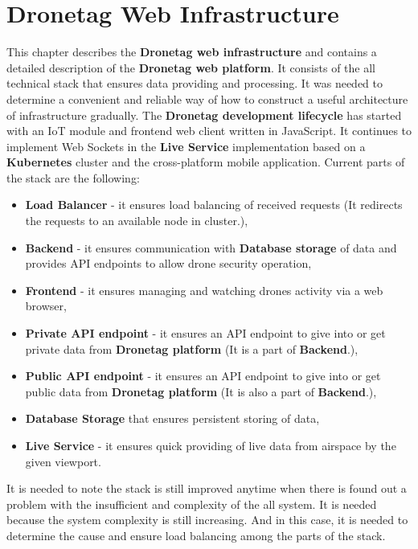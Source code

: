 \chapter{Dronetag Web Infrastructure}\label{ch:dronetag-web-infrastructure}
This chapter describes the \textbf{Dronetag web infrastructure} and contains a detailed description of the \textbf{Dronetag web platform}.
It consists of the all technical stack that ensures data providing and processing.
It was needed to determine a convenient and reliable way of how to construct a useful architecture of infrastructure gradually.
The \textbf{Dronetag development lifecycle} has started with an IoT module and frontend web client written in JavaScript.
It continues to implement Web Sockets in the \textbf{Live Service} implementation based on a \textbf{Kubernetes} cluster and the cross-platform mobile application.
Current parts of the stack are the following:
\begin{itemize}
    \item \textbf{Load Balancer} - it ensures load balancing of received requests (It redirects the requests to an available node in cluster.),
    \item \textbf{Backend} - it ensures communication with \textbf{Database storage} of data and provides API endpoints to allow drone security operation,
    \item \textbf{Frontend} - it ensures managing and watching drones activity via a web browser,
    \item \textbf{Private API endpoint} - it ensures an API endpoint to give into or get private data from \textbf{Dronetag platform} (It is a part of \textbf{Backend}.),
    \item \textbf{Public API endpoint} - it ensures an API endpoint to give into or get public data from \textbf{Dronetag platform} (It is also a part of \textbf{Backend}.),
    \item \textbf{Database Storage} that ensures persistent storing of data,
    \item \textbf{Live Service} - it ensures quick providing of live data from airspace by the given viewport.
\end{itemize}
It is needed to note the stack is still improved anytime when there is found out a problem with the insufficient and complexity of the all system.
It is needed because the system complexity is still increasing.
And in this case, it is needed to determine the cause and ensure load balancing among the parts of the stack.

